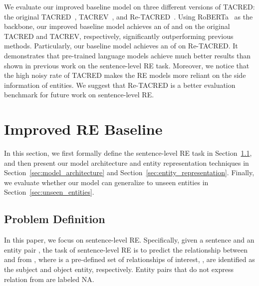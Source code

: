 \documentclass[11pt,a4paper]{article}
\begin{document}
We evaluate our improved baseline model on three different versions of TACRED: the original TACRED~\cite{zhang-etal-2017-position}, TACREV~\cite{alt-etal-2020-tacred}, and Re-TACRED~\cite{stoica2021re}.
Using RoBERTa~\cite{liu2019roberta} as the backbone, our improved baseline model achieves an  of  and  on the original TACRED and TACREV, respectively, significantly outperforming previous methods.
Particularly, our baseline model achieves an  of  on Re-TACRED.
It demonstrates that pre-trained language models achieve much better results than shown in previous work on the sentence-level RE task.
Moreover, we notice that the high noisy rate of TACRED makes the RE models more reliant on the side information of entities.
We suggest that Re-TACRED is a better evaluation benchmark for future work on sentence-level RE.


\section{Improved RE Baseline}

In this section, we first formally define the sentence-level RE task in Section~\ref{sec:task_definition}, and then present our model architecture and entity representation techniques in Section~\ref{sec:model_architecture} and Section~\ref{sec:entity_representation}.
Finally, we evaluate whether our model can generalize to unseen entities in Section~\ref{sec:unseen_entities}.

\subsection{Problem Definition}
\label{sec:task_definition}
In this paper, we focus on sentence-level RE.
Specifically, given a sentence  and an entity pair , the task of sentence-level RE is to predict the relationship  between  and  from , where  is a pre-defined set of relationships of interest, ,  are identified as the subject and object entity, respectively.
Entity pairs that do not express relation from  are labeled \textsc{NA}.
\end{document}
